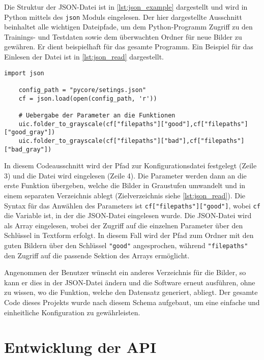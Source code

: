 Die Struktur der \ac{JSON}-Datei ist in \autoref{lst:json_example} dargestellt und wird in Python mittels des \texttt{json} Moduls eingelesen. Der hier dargestellte Ausschnitt beinhaltet alle wichtigen Dateipfade, um dem Python-Programm Zugriff zu den Trainings- und Testdaten sowie dem überwachten Ordner für neue Bilder zu gewähren. Er dient beispielhaft für das gesamte Programm. Ein Beispiel für das Einlesen der Datei ist in \autoref{lst:json_read} dargestellt.

\begin{lstlisting}[style=python, label=lst:json_read, caption={Einlesen der \ac{JSON}-Datei}]
    import json

    config_path = "pycore/setings.json"
    cf = json.load(open(config_path, 'r'))

    # Uebergabe der Parameter an die Funktionen
    uic.folder_to_grayscale(cf["filepaths"]["good"],cf["filepaths"]["good_gray"])
    uic.folder_to_grayscale(cf["filepaths"]["bad"],cf["filepaths"]["bad_gray"])

\end{lstlisting}

In diesem Codeausschnitt wird der Pfad zur Konfigurationsdatei festgelegt (Zeile 3) und die Datei wird eingelesen (Zeile 4). Die Parameter werden dann an die erste Funktion übergeben, welche die Bilder in Graustufen umwandelt und in einem separaten Verzeichnis ablegt (Zielverzeichnis siehe \autoref{lst:json_read}). Die Syntax für das Anwählen des Parameters ist \texttt{cf["filepaths"]["good"]}, wobei \texttt{cf} die Variable ist, in der die \ac{JSON}-Datei eingelesen wurde. Die \ac{JSON}-Datei wird als Array eingelesen, wobei der Zugriff auf die einzelnen Parameter über den Schlüssel in Textform erfolgt. In diesem Fall wird der Pfad zum Ordner mit den guten Bildern über den Schlüssel \texttt{"good"} angesprochen, während \texttt{"filepaths"} den Zugriff auf die passende Sektion des Arrays ermöglicht.

Angenommen der Benutzer wünscht ein anderes Verzeichnis für die Bilder, so kann er dies in der \ac{JSON}-Datei ändern und die Software erneut ausführen, ohne zu wissen, wo die Funktion, welche den Datensatz generiert, abliegt. 
Der gesamte Code dieses Projekts wurde nach diesem Schema aufgebaut, um eine einfache und einheitliche Konfiguration zu gewährleisten.

\section{Entwicklung der API} \label{subsec:entwicklung_der_api}

